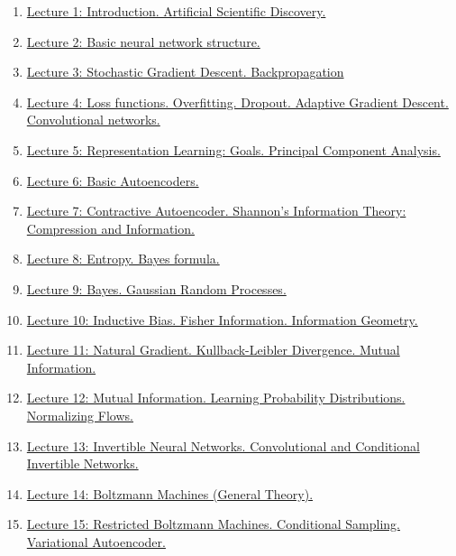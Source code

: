 \documentclass[11pt]{article}
\begin{document}
\begin{enumerate}
	\item \href{https://mp.weixin.qq.com/s/mzK9xnrxmOKGNyVy4fHocQ}{Lecture 1: Introduction. Artificial Scientific Discovery.} %
	\item \href{https://mp.weixin.qq.com/s/2ulUaFS__dZurnQ70kmWWQ}{Lecture 2: Basic neural network structure.} %
	\item \href{https://mp.weixin.qq.com/s/94F0Q32cobXLfBuKeAsaog}{Lecture 3: Stochastic Gradient Descent. Backpropagation} %
	\item \href{https://mp.weixin.qq.com/s/0gZzScsgtwV1WHjSSkziUw}{Lecture 4: Loss functions. Overfitting. Dropout. Adaptive Gradient Descent. Convolutional networks.}%
	\item \href{https://mp.weixin.qq.com/s/ggM9hb298_Mxe8JKjRVI_Q}{Lecture 5: Representation Learning: Goals. Principal Component Analysis.}%
	\item \href{https://mp.weixin.qq.com/s/H61taZpRSTCBQqykXs-70g}{Lecture 6: Basic Autoencoders.}%
	\item \href{https://mp.weixin.qq.com/s/vyJukgqDgnBByaqotPtedA}{Lecture 7: Contractive Autoencoder. Shannon's Information Theory: Compression and Information.}%
	\item \href{https://mp.weixin.qq.com/s/WjIuCGRhNVE-BlhrHEbGWA}{Lecture 8: Entropy. Bayes formula.}%
	\item \href{https://mp.weixin.qq.com/s/CBjRzYZOudjrSp1UTZlI4Q}{Lecture 9: Bayes. Gaussian Random Processes.}%
	\item \href{https://mp.weixin.qq.com/s/uan1k-91A49GFpcgM4F6kQ}{Lecture 10: Inductive Bias. Fisher Information. Information Geometry.}%
	\item \href{https://mp.weixin.qq.com/s/I6Aa-ZAFrye0qlfhZquOVQ}{Lecture 11: Natural Gradient. Kullback-Leibler Divergence. Mutual Information.}%
	\item \href{https://mp.weixin.qq.com/s/xZs7W0xHQQY_EpSMonqkWQ}{Lecture 12: Mutual Information. Learning Probability Distributions. Normalizing Flows.}%
	\item \href{https://mp.weixin.qq.com/s/XA5j3-sfTkUyrwEe0iF2fA}{Lecture 13: Invertible Neural Networks. Convolutional and Conditional Invertible Networks.}%
	\item \href{https://mp.weixin.qq.com/s/uENPzwLW7mau1l-jN8qsVA}{Lecture 14: Boltzmann Machines (General Theory).}%
	\item \href{https://mp.weixin.qq.com/s/gELMbha7Xw8SAXZGKmsH4w}{Lecture 15: Restricted Boltzmann Machines. Conditional Sampling. Variational Autoencoder.}%

\end{enumerate}
\end{document}
